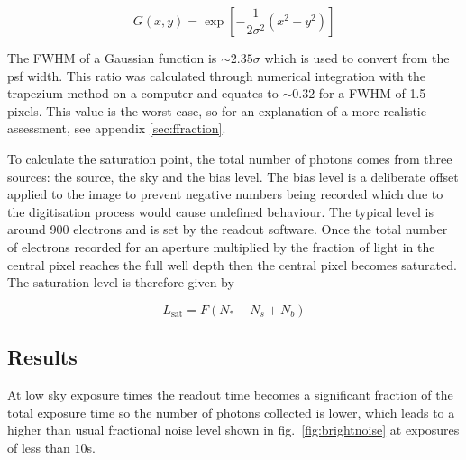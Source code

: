 \documentclass[11pt,a4paper]{report}
\begin{document}

\[
G(x,y) = \exp \left[
		-\frac{1}{2\sigma^{2}} \left(
			x^{2} + y^{2}
		\right)
	\right]
\]

The FWHM of a Gaussian function is $\sim 2.35 \sigma$ which is used to
convert from the psf width. This ratio was calculated through numerical
integration with the trapezium method on a computer and equates to $\sim
0.32$ for a FWHM of 1.5 pixels. This value is the worst case, so for an
explanation of a more realistic assessment, see appendix \ref{sec:ffraction}.


To calculate the saturation point, the total number of photons comes
from three sources: the source, the sky and the bias level. The bias
level is a deliberate offset applied to the image to prevent negative
numbers being recorded which due to the digitisation process would cause
undefined behaviour. The typical level is around 900 electrons and is
set by the readout software. Once the total number of electrons recorded
for an aperture multiplied by the fraction of light in the central pixel
reaches the full well depth then the central pixel becomes saturated.
The saturation level is therefore given by

\[
    L_{\mathrm{sat}} = F  (N_{\ast} + N_{s} + N_{b})
    \]



\subsection{Results}

At low sky exposure times the readout time becomes a significant fraction of the total exposure time so the number of photons collected is lower, which leads to a higher than usual fractional noise level shown in fig.~\ref{fig:brightnoise} at exposures of less than $10$s.
\end{document}
